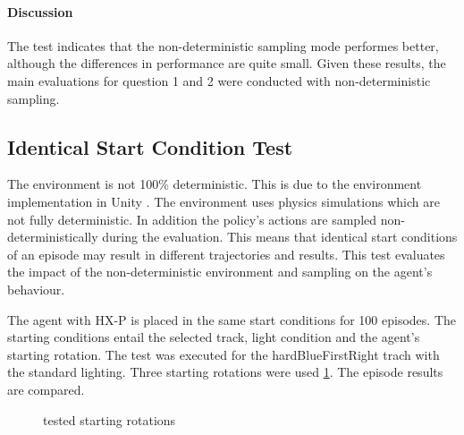 \paragraph{Discussion}
The test indicates that the non-deterministic sampling mode performes better, although the differences in performance are quite small. Given these results, the main evaluations for question 1 and 2 were conducted with non-deterministic sampling.

\subsection{Identical Start Condition Test}

The environment is not 100\% deterministic. This is due to the environment implementation in Unity \autocite{unity_fixed-update}. The environment uses physics simulations which are not fully deterministic. In addition the policy's actions are sampled non-deterministically during the evaluation.
This means that identical start conditions of an episode may result in different trajectories and results. This test evaluates the impact of the non-deterministic environment and sampling on the agent's behaviour. 

The agent with \ac{HX-P} is placed in the same start conditions for 100 episodes. The starting conditions entail the selected track, light condition and the agent's starting rotation. The test was executed for the hardBlueFirstRight trach with the standard lighting. Three starting rotations were used \ref{fig:identical_start_conditions_test_rotations}.
The episode results are compared.

\begin{figure}
    \centering
    \caption{tested starting rotations}
    \label{fig:identical_start_conditions_test_rotations}
\end{figure}

